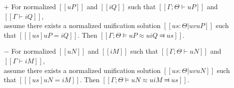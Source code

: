\begin{lemma} \label{lemma:unification-completeness}
    \hfill
    \begin{itemize}
        \item [$+$] For normalized $[[uP]]$ and $[[iQ]]$ such that
        $[[Γ ; Θ ⊢ uP]]$ and $[[Γ ⊢ iQ]]$,\\ 
        assume there exists a normalized unification solution
        $[[us : Θ | uv uP]]$ such that $[[ [us]uP = iQ ]]$.
        Then $[[Γ ; Θ ⊨ uP ≈u iQ ⫤ us]]$.
        
        \item [$-$] For normalized $[[uN]]$ and $[[iM]]$ such that
        $[[Γ ; Θ ⊢ uN]]$ and $[[Γ ⊢ iM]]$,\\
        assume there exists a normalized unification solution
        $[[us : Θ | uv uN]]$        
        such that $[[ [us]uN = iM ]]$.
        Then $[[Γ ; Θ ⊨ uN ≈u iM ⫤ us]]$.
   \end{itemize}
\end{lemma}
